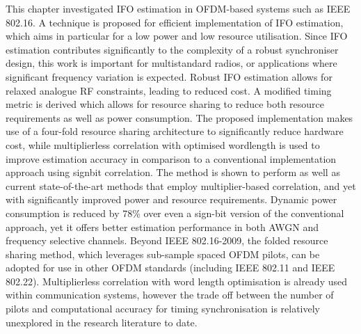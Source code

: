 This chapter investigated IFO estimation in OFDM-based systems such as IEEE 802.16. A technique is proposed for efficient implementation of IFO estimation, which aims in particular for a low power and low resource utilisation.
Since IFO estimation contributes significantly to the complexity of a robust synchroniser design, this work is important for multistandard radios, or applications where significant frequency variation is expected. Robust IFO estimation allows for relaxed analogue RF constraints, leading to reduced cost. A modified timing metric is derived which allows for resource sharing to reduce both resource requirements as well as power consumption. The proposed implementation makes use of a four-fold resource sharing architecture to significantly reduce hardware cost, while multiplierless correlation with optimised wordlength is used to improve estimation accuracy in comparison to a conventional implementation approach using signbit correlation.
The method is shown to perform as well as current state-of-the-art methods that employ multiplier-based correlation, and yet with significantly improved power and resource requirements. Dynamic power consumption is reduced by 78\% over even a sign-bit version of the conventional approach, yet it offers better estimation performance in both AWGN and frequency selective channels.
Beyond IEEE 802.16-2009, the folded resource sharing method, which leverages sub-sample spaced OFDM pilots, can be adopted for use in other OFDM standards (including IEEE 802.11 and IEEE 802.22). Multiplierless correlation with word length optimisation is already used within communication systems, however the trade off between the number of pilots and computational accuracy for timing synchronisation is relatively unexplored in the research literature to date.
